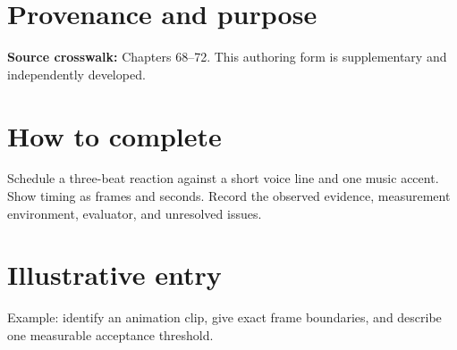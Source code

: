 \documentclass[10pt,letterpaper]{article}
\begin{document}
\makedoctitle
\makedocsummary

\section{Provenance and purpose}
\textbf{Source crosswalk:} Chapters 68--72. This authoring form is supplementary and independently developed.
\section{How to complete}
Schedule a three-beat reaction against a short voice line and one music accent. Show timing as frames and seconds. Record the observed evidence, measurement environment, evaluator, and unresolved issues. 
\section{Illustrative entry}
Example: identify an animation clip, give exact frame boundaries, and describe one measurable acceptance threshold.
\end{document}
